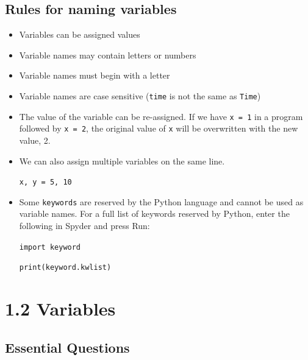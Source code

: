 \documentclass[12pt]{article}
\begin{document}
\subsection*{Rules for naming variables}
	\begin{itemize}
        \item Variables can be assigned values
        \item Variable names may contain letters or numbers
        \item Variable names must begin with a letter
        \item Variable names are case sensitive ({\tt time} is not the same as {\tt Time})
        \item The value of the variable can be re-assigned. If we have {\tt x = 1} in a program followed by {\tt x = 2}, the original value of {\tt x} will be overwritten with the new value, 2. 
        \item We can also assign multiple variables on the same line.
	
	    \vspace{0.5em}
		{\tt x, y  = 5, 10}
		\vspace{0.5em}
		
        \item Some {\tt keywords} are reserved by the Python language and cannot be used as variable names. For a full list of keywords reserved by Python, enter the following in Spyder and press Run:
		
		\vspace{0.5em}
		{\tt import keyword}
		
		{\tt print(keyword.kwlist)}
		\vspace{0.5em}
    \end{itemize}
    
\section*{1.2 Variables}

\subsection*{Essential Questions}
\end{document}
